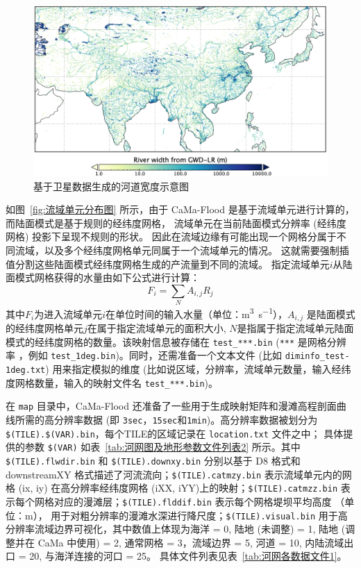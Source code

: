 {
\begin{figure}[htbp]
\centering
\includegraphics[width=1.0\textwidth]{Figures/陆地表面的水分循环/基于卫星数据生成的河道宽度示意图.png}
\caption{基于卫星数据生成的河道宽度示意图}
\label{fig:基于卫星数据生成的河道宽度示意图}
\end{figure}
}

如图~\ref{fig:流域单元分布图} 所示，由于 CaMa-Flood 是基于流域单元进行计算的，而陆面模式是基于规则的经纬度网格，
流域单元在当前陆面模式分辨率 (经纬度网格) 投影下呈现不规则的形状。
因此在流域边缘有可能出现一个网格分属于不同流域，以及多个经纬度网格单元同属于一个流域单元的情况。
这就需要强制插值分割这些陆面模式经纬度网格生成的产流量到不同的流域。
指定流域单元$i$从陆面模式网格获得的水量由如下公式进行计算：
\begin{equation}
F_{i}=\sum_{N} A_{i, j} R_{j}
\end{equation}
其中$F_i$为进入流域单元$i$在单位时间的输入水量（单位：\unit{m^3.s^{-1}}），$A_{i, j}$ 是陆面模式的经纬度网格单元$j$在属于指定流域单元的面积大小,
 $N$是指属于指定流域单元陆面模式的经纬度网格的数量。该映射信息被存储在 \texttt{test\_***.bin} (\texttt{***} 是网格分辨率
 ，例如 \texttt{test\_1deg.bin})。同时，还需准备一个文本文件 (比如 \texttt{diminfo\_test-1deg.txt}) 用来指定模拟的维度
  (比如说区域，分辨率，流域单元数量，输入经纬度网格数量，输入的映射文件名 \texttt{test\_***.bin})。

在 \texttt{map} 目录中，CaMa-Flood 还准备了一些用于生成映射矩阵和漫滩高程剖面曲线所需的高分辨率数据 (即 \texttt{3sec}，\texttt{15sec}和\texttt{1min})。高分辨率数据被划分为\texttt{\$(TILE).\$(VAR)\allowbreak.bin}，每个TILE的区域记录在 \texttt{location.txt} 文件之中；
具体提供的参数 \texttt{\$(VAR)} 如表~\ref{tab:河网图及地形参数文件列表2} 所示。其中 \texttt{\$(TILE).flwdir.bin} 和
\texttt{\$(TILE).downxy.bin} 分别以基于 D8 格式和 downstreamXY 格式描述了河流流向；\texttt{\$(TILE).catmzy.bin} 表示流域单元内的网格 (ix, iy) 
在高分辨率经纬度网格 (iXX, iYY)上的映射；\texttt{\$(TILE).catmzz.bin} 表示每个网格对应的漫滩层；\texttt{\$(TILE).flddif.bin} 表示每个网格堤坝平均高度 （单位：m），
用于对粗分辨率的漫滩水深进行降尺度；\texttt{\$(TILE).visual.bin} 用于高分辨率流域边界可视化，其中数值上体现为海洋 = 0, 
陆地 (未调整) = 1, 陆地 (调整并在 CaMa 中使用) = 2, 通常网格 = 3，流域边界 = 5, 河道 = 10, 内陆流域出口 = 20, 与海洋连接的河口 = 25。
具体文件列表见表~\ref{tab:河网各数据文件1}。

